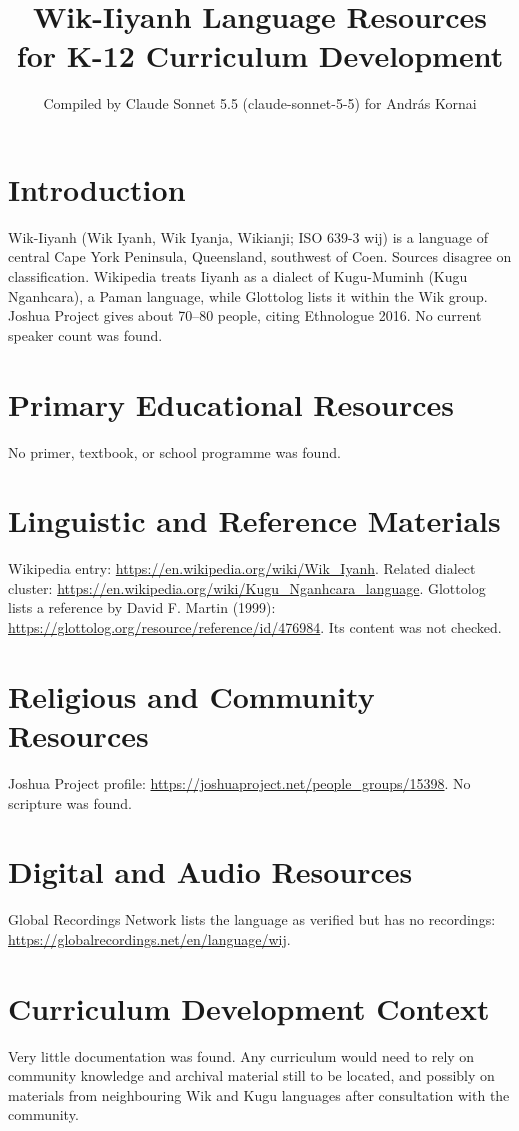 \documentclass[12pt]{article}
\title{Wik-Iiyanh Language Resources for K-12 Curriculum Development}
\author{Compiled by Claude Sonnet 5.5 (claude-sonnet-5-5) for Andr\'as Kornai}
\date{}
\begin{document}
\maketitle

\section{Introduction}
Wik-Iiyanh (Wik Iyanh, Wik Iyanja, Wikianji; ISO 639-3 wij) is a language of central Cape York Peninsula, Queensland, southwest of Coen. Sources disagree on classification. Wikipedia treats Iiyanh as a dialect of Kugu-Muminh (Kugu Nganhcara), a Paman language, while Glottolog lists it within the Wik group. Joshua Project gives about 70--80 people, citing Ethnologue 2016. No current speaker count was found.

\section{Primary Educational Resources}
No primer, textbook, or school programme was found.

\section{Linguistic and Reference Materials}
Wikipedia entry: \url{https://en.wikipedia.org/wiki/Wik_Iyanh}. Related dialect cluster: \url{https://en.wikipedia.org/wiki/Kugu_Nganhcara_language}. Glottolog lists a reference by David F. Martin (1999): \url{https://glottolog.org/resource/reference/id/476984}. Its content was not checked.

\section{Religious and Community Resources}
Joshua Project profile: \url{https://joshuaproject.net/people_groups/15398}. No scripture was found.

\section{Digital and Audio Resources}
Global Recordings Network lists the language as verified but has no recordings: \url{https://globalrecordings.net/en/language/wij}.

\section{Curriculum Development Context}
Very little documentation was found. Any curriculum would need to rely on community knowledge and archival material still to be located, and possibly on materials from neighbouring Wik and Kugu languages after consultation with the community.
\end{document}
